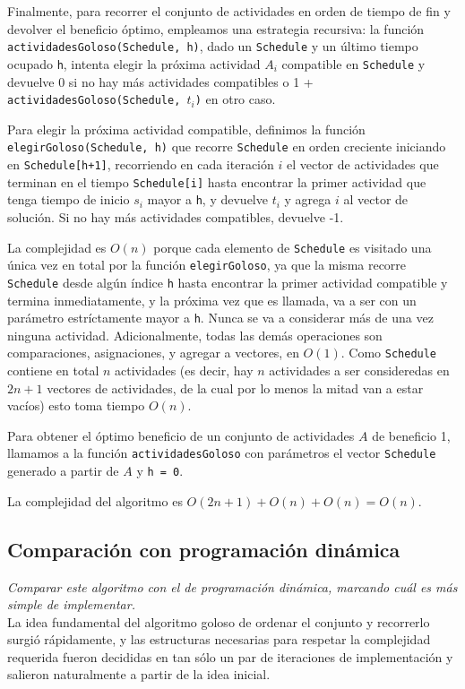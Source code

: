\documentclass[10pt, a4paper]{article}
\begin{document}
Finalmente, para recorrer el conjunto de actividades en orden de tiempo de fin y devolver el beneficio óptimo, empleamos una estrategia recursiva: la función \texttt{actividadesGoloso(Schedule, h)}, dado un \texttt{Schedule} y un último tiempo ocupado \texttt{h}, intenta elegir la próxima actividad $A_i$ compatible en \texttt{Schedule} y devuelve 0 si no hay más actividades compatibles o 1 + \texttt{actividadesGoloso(Schedule, $t_i$)} en otro caso.

Para elegir la próxima actividad compatible, definimos la función \texttt{elegirGoloso(Schedule, h)} que recorre \texttt{Schedule} en orden creciente iniciando en \texttt{Schedule[h+1]}, recorriendo en cada iteración $i$ el vector de actividades que terminan en el tiempo \texttt{Schedule[i]} hasta encontrar la primer actividad que tenga tiempo de inicio $s_i$ mayor a \texttt{h}, y devuelve $t_i$ y agrega $i$ al vector de solución. Si no hay más actividades compatibles, devuelve -1.

La complejidad es $O(n)$ porque cada elemento de \texttt{Schedule} es visitado una única vez en total por la función \texttt{elegirGoloso}, ya que la misma recorre \texttt{Schedule} desde algún índice \texttt{h} hasta encontrar la primer actividad compatible y termina inmediatamente, y la próxima vez que es llamada, va a ser con un parámetro estríctamente mayor a \texttt{h}. Nunca se va a considerar más de una vez ninguna actividad. Adicionalmente, todas las demás operaciones son comparaciones, asignaciones, y agregar a vectores, en $O(1)$. Como \texttt{Schedule} contiene en total $n$ actividades (es decir, hay $n$ actividades a ser consideredas en $2n+1$ vectores de actividades, de la cual por lo menos la mitad van a estar vacíos) esto toma tiempo $O(n)$.

Para obtener el óptimo beneficio de un conjunto de actividades $A$ de beneficio 1, llamamos a la función \texttt{actividadesGoloso} con parámetros el vector \texttt{Schedule} generado a partir de $A$ y \texttt{h = 0}.

La complejidad del algoritmo es $O(2n+1) + O(n) + O(n) = O(n)$.

\subsection{Comparación con programación dinámica}
\emph{Comparar este algoritmo con el de programación dinámica, marcando cuál es más simple de implementar.} \\

La idea fundamental del algoritmo goloso de ordenar el conjunto y recorrerlo surgió rápidamente, y las estructuras necesarias para respetar la complejidad requerida fueron decididas en tan sólo un par de iteraciones de implementación y salieron naturalmente a partir de la idea inicial.
\end{document}
